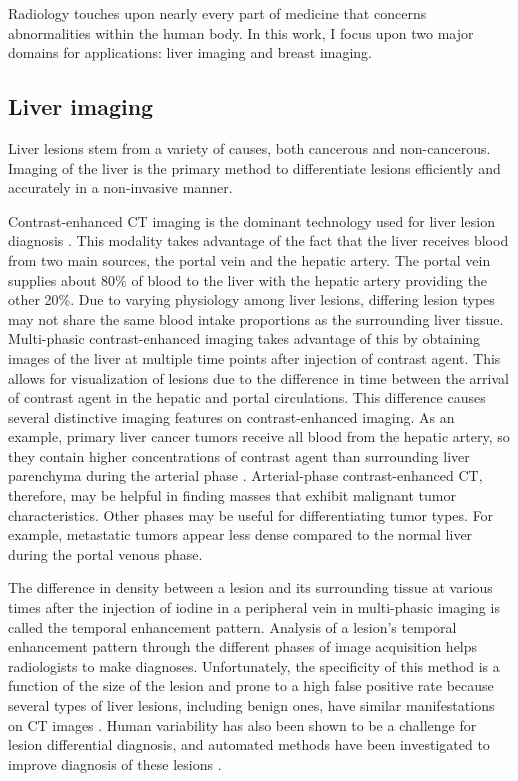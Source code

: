 Radiology touches upon nearly every part of medicine that concerns abnormalities within the human body. In this work, I focus upon two major domains for applications: liver imaging and breast imaging.

\subsection{Liver imaging}
Liver lesions stem from a variety of causes, both cancerous and non-cancerous. Imaging of the liver is the primary method to differentiate lesions efficiently and accurately in a non-invasive manner.

Contrast-enhanced CT imaging is the dominant technology used for liver lesion diagnosis \cite{Baron:1994vg}. This modality takes advantage of the fact that the liver receives blood from two main sources, the portal vein and the hepatic artery. The portal vein supplies about 80\% of blood to the liver with the hepatic artery providing the other 20\%. Due to varying physiology among liver lesions, differing lesion types may not share the same blood intake proportions as the surrounding liver tissue. Multi-phasic contrast-enhanced imaging takes advantage of this by obtaining images of the liver at multiple time points after injection of contrast agent. This allows for visualization of lesions due to the difference in time between the arrival of contrast agent in the hepatic and portal circulations. This difference causes several distinctive imaging features on contrast-enhanced imaging. As an example, primary liver cancer tumors receive all blood from the hepatic artery, so they contain higher concentrations of contrast agent than surrounding liver parenchyma during the arterial phase \cite{Lautt:1987wma,Matsui:1991vba}. Arterial-phase contrast-enhanced CT, therefore, may be helpful in finding masses that exhibit malignant tumor characteristics. Other phases may be useful for differentiating tumor types. For example, metastatic tumors appear less dense compared to the normal liver during the portal venous phase.

The difference in density between a lesion and its surrounding tissue at various times after the injection of iodine in a peripheral vein in multi-phasic imaging is called the temporal enhancement pattern. Analysis of a lesion's temporal enhancement pattern through the different phases of image acquisition helps radiologists to make diagnoses. Unfortunately, the specificity of this method is a function of the size of the lesion and prone to a high false positive rate because several types of liver lesions, including benign ones, have similar manifestations on CT images \cite{Lencioni:2005ia}. Human variability has also been shown to be a challenge for lesion differential diagnosis, and automated methods have been investigated to improve diagnosis of these lesions \cite{Armato:2007ks}.


